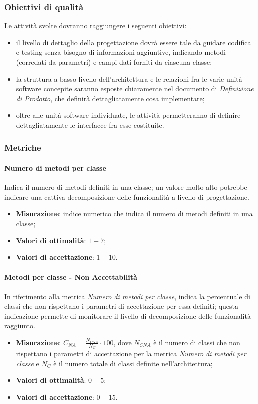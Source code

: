 \subsubsection{Obiettivi di qualità}
Le attività svolte dovranno raggiungere i seguenti obiettivi:
\begin{itemize}
\item il livello di dettaglio della progettazione dovrà essere tale da guidare codifica e testing senza bisogno di informazioni aggiuntive, indicando metodi (corredati da parametri) e campi dati forniti da ciascuna classe;
\item la struttura a basso livello dell'architettura e le relazioni fra le varie unità software concepite saranno esposte chiaramente nel documento di \textit{Definizione di Prodotto}, che definirà dettagliatamente cosa implementare;
\item oltre alle unità software individuate, le attività permetteranno di definire dettagliatamente le interfacce fra esse costituite.
\end{itemize}
\subsubsection{Metriche}
\paragraph{Numero di metodi per classe}
\label{numMetodiClasse}
Indica il numero di metodi definiti in una classe; un valore molto alto potrebbe indicare una cattiva decomposizione delle funzionalità a livello di progettazione.
\begin{itemize}
\item \textbf{Misurazione}: indice numerico che indica il numero di metodi definiti in una classe;
\item \textbf{Valori di ottimalità}: $1 - 7$;
\item \textbf{Valori di accettazione}: $1 - 10$.
\end{itemize}
\paragraph{Metodi per classe - Non Accettabilità}
\label{numMetodiClasseNA}
In riferimento alla metrica \textit{Numero di metodi per classe}, indica la percentuale di classi che non rispettano i parametri di accettazione per essa definiti; questa indicazione permette di monitorare il livello di decomposizione delle funzionalità raggiunto.
\begin{itemize}
\item \textbf{Misurazione}: $C_{NA}=\frac{N_{CNA}}{N_{C}} \cdot 100$, dove $N_{CNA}$ è il numero di classi che non rispettano i parametri di accettazione per la metrica \textit{Numero di metodi per classe} e $N_{C}$ è il numero totale di classi definite nell'architettura;
\item \textbf{Valori di ottimalità}: $0 - 5$;
\item \textbf{Valori di accettazione}: $0 - 15$.
\end{itemize}
